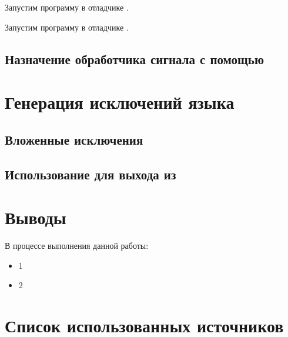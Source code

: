 
Запустим программу  в отладчике .




Запустим программу  в отладчике .



\subsection{Назначение обработчика сигнала с помощью }

\section{Генерация исключений языка }

\subsection{Вложенные исключения}

\subsection{Использование  для выхода из }

\section{Выводы}

В процессе выполнения данной работы:

\begin{itemize}
	\item 1
	\item 2
\end{itemize}

\newpage

\section*{Список использованных источников}

